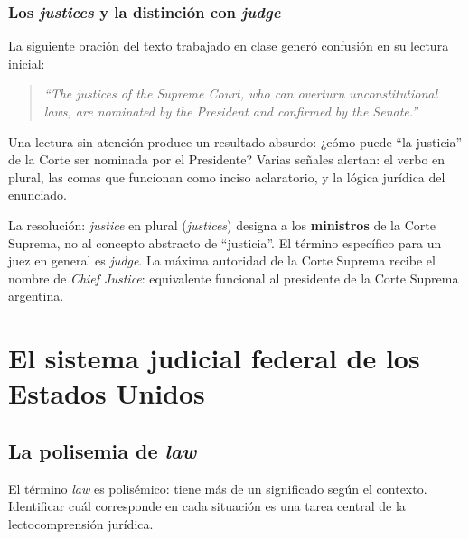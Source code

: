 \documentclass[12pt,oneside]{book}
\begin{document}
\subsection{Los \textit{justices} y la distinción con \textit{judge}}
\label{sec:justice}

La siguiente oración del texto trabajado en clase generó confusión en su lectura inicial:

\begin{quote}
\textit{``The justices of the Supreme Court, who can overturn unconstitutional laws, are nominated by the President and confirmed by the Senate.''}
\end{quote}

Una lectura sin atención produce un resultado absurdo: ¿cómo puede ``la justicia'' de la Corte ser nominada por el Presidente? Varias señales alertan: el verbo en plural, las comas que funcionan como inciso aclaratorio, y la lógica jurídica del enunciado.

La resolución: \textit{justice} en plural (\textit{justices}) designa a los \textbf{ministros} de la Corte Suprema, no al concepto abstracto de ``justicia''. El término específico para un juez en general es \textit{judge}. La máxima autoridad de la Corte Suprema recibe el nombre de \textit{Chief Justice}: equivalente funcional al presidente de la Corte Suprema argentina.

\chapter{El sistema judicial federal de los Estados Unidos}
\label{cap:poder-judicial}

\section{La polisemia de \textit{law}}

El término \textit{law} es polisémico: tiene más de un significado según el contexto. Identificar cuál corresponde en cada situación es una tarea central de la lectocomprensión jurídica.
\end{document}
